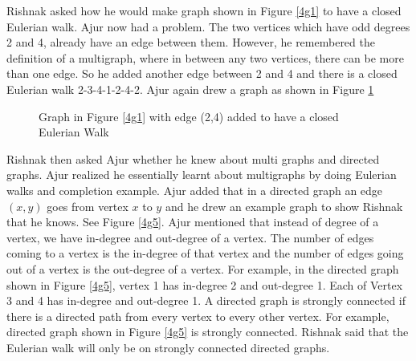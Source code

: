 Rishnak asked how he would make graph shown in Figure \ref{4g1} to have a closed Eulerian walk. Ajur now had a problem. The two vertices which have odd degrees 2 and 4, already have an edge between them. However, he remembered the definition of a multigraph, where in between any two vertices, there can be more than one edge. So he added another edge between 2 and 4 and there is a closed Eulerian walk 2-3-4-1-2-4-2. Ajur again drew a graph as shown in Figure \ref{4g155}
\begin{figure}
\begin{center}
\caption{ Graph in Figure \ref{4g1} with edge (2,4) added to have a closed Eulerian Walk}\label{4g155}
\end{center}
\end{figure}

\vspace{3in}
Rishnak then asked Ajur whether he knew about multi graphs and directed graphs. Ajur realized he essentially learnt about multigraphs  by doing Eulerian walks and completion  example. Ajur added that in a directed graph an edge $(x,y)$ goes from vertex $x$ to $y$ and he drew an example graph to show Rishnak that he knows. See Figure \ref{4g5}. Ajur mentioned that instead of degree of a vertex, we have in-degree and out-degree of a vertex. The number of edges coming to a vertex is the in-degree of that vertex and the number of edges going out of a vertex is the out-degree of a vertex. For example, in the directed graph shown in Figure \ref{4g5}, vertex 1 has in-degree 2 and out-degree 1. Each of Vertex 3 and 4 has in-degree  and out-degree 1. A directed graph is strongly connected if there is a directed path from every vertex to every other vertex. For example, directed graph shown in Figure \ref{4g5} is strongly connected. Rishnak said that the Eulerian walk will only be on strongly connected directed graphs.

